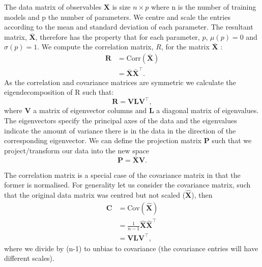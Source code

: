The data matrix of observables $\mathbf{X}$ is size ${n \times p}$ where n is the number of training models and p the number of parameters.
We centre and scale the entries according to the mean and standard deviation of each parameter.
The resultant matrix,  $\mathbf{\bar{X}}$, therefore has the property that for each parameter, $p$, ${\mu(p) =0}$ and ${\sigma(p) =1}$. 
We compute the correlation matrix, $R$, for the matrix  $\mathbf{\bar{X}}$ :
\begin{eqnarray}
    \mathbf{R}  &= \text{Corr}(\mathbf{\bar{X}}) \\[3pt] \nonumber
                &= \mathbf{\bar{X}}\mathbf{\bar{X}^\top}.  
\end{eqnarray}
As the correlation and covariance matrices are symmetric we calculate the eigendecomposition of R such that:
\begin{equation}
\mathbf{R}=\mathbf{VLV^\top},
\end{equation}  
where \textbf{V} a matrix of eigenvector columns and \textbf{L} a diagonal matrix of eigenvalues.
The eigenvectors specify the principal axes of the data and the eigenvalues indicate the amount of variance there is in the data in the direction of the corresponding eigenvector.
We can define the projection matrix \textbf{P} such that we project/transform our data into the new space    
\begin{equation}
\mathbf{P} = \mathbf{\bar{X}}  \mathbf{V}.
\end{equation}


The correlation matrix is a special case of the covariance matrix in that the former is normalised.
For generality let us consider the covariance matrix, such that the original data matrix was centred but not scaled ($\mathbf{\hat{X}}$), then
\begin{eqnarray}
    \mathbf{C}  &= \text{Cov}(\mathbf{\hat{X}}) \\[3pt] \nonumber
                &= \frac{1}{n-1}\mathbf{\hat{X}}\mathbf{\hat{X}^\top}\\[3pt] \nonumber
                &= \mathbf{V} \mathbf{L} \mathbf{V^\top},
\end{eqnarray}
where we divide by (n-1) to unbias to covariance (the covariance entries will have different scales).

